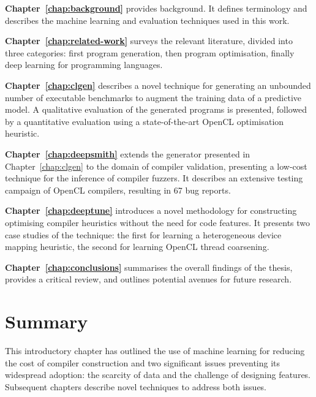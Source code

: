 \textbf{Chapter~\ref{chap:background}} provides background. It defines terminology and describes the machine learning and evaluation techniques used in this work.

\textbf{Chapter~\ref{chap:related-work}} surveys the relevant literature, divided into three categories: first program generation, then program optimisation, finally deep learning for programming languages.

\textbf{Chapter~\ref{chap:clgen}} describes a novel technique for generating an unbounded number of executable benchmarks to augment the training data of a predictive model. A qualitative evaluation of the generated programs is presented, followed by a quantitative evaluation using a state-of-the-art OpenCL optimisation heuristic.

\textbf{Chapter~\ref{chap:deepsmith}} extends the generator presented in Chapter~\ref{chap:clgen} to the domain of compiler validation, presenting a low-cost technique for the inference of compiler fuzzers. It describes an extensive testing campaign of OpenCL compilers, resulting in 67 bug reports.

\textbf{Chapter~\ref{chap:deeptune}} introduces a novel methodology for constructing optimising compiler heuristics without the need for code features. It presents two case studies of the technique: the first for learning a heterogeneous device mapping heuristic, the second for learning OpenCL thread coarsening.

\textbf{Chapter~\ref{chap:conclusions}} summarises the overall findings of the thesis, provides a critical review, and outlines potential avenues for future research.


\section{Summary}

This introductory chapter has outlined the use of machine learning for reducing the cost of compiler construction and two significant issues preventing its widespread adoption: the scarcity of data and the challenge of designing features. Subsequent chapters describe novel techniques to address both issues.
